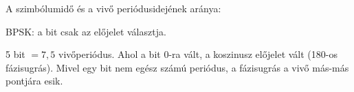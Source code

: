 A szimbólumidő és a vivő periódusidejének aránya:

\begin{center}\end{center}

BPSK: a bit csak az előjelet választja.

\begin{center}\end{center}

5 bit $=7{,}5$ vivőperiódus. Ahol a bit 0-ra vált, a koszinusz előjelet vált (180\textdegree{}-os fázisugrás). Mivel egy bit nem egész számú periódus, a fázisugrás a vivő más-más pontjára esik.

